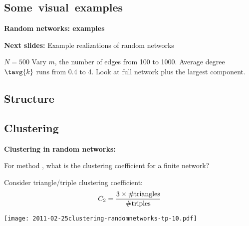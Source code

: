 \begin{frame}[label=]
\begin{frame}[label=]
\begin{frame}[label=]
\begin{frame}[label=]
    
  
  


\subsection{Some\ visual\ examples}

\begin{frame}[label=]
  \textbf{Random networks: examples}

  \textbf{Next slides:}
    Example realizations of random networks
    
     $N=500$
     Vary $m$, the number of edges from 100 to 1000.
     Average degree $\tavg{k}$ runs from 0.4 to 4.
     Look at full network plus the largest component.
    
  













\section{Structure}

\subsection{Clustering}

  \textbf{Clustering in random networks:}
  
  
     
      For method , 
      what is the clustering coefficient for a finite network?
    
      Consider triangle/triple clustering coefficient:\cite{newman2003a}
      $$ C_2 = \frac{3 \times \textnormal{\#triangles}}{\textnormal{\#triples}} $$ 
  
    
      
    \texttt{[image: 2011-02-25clustering-randomnetworks-tp-10.pdf]}
    
    
     

\end{frame}
\end{frame}
\end{frame}
\end{frame}
\end{frame}
